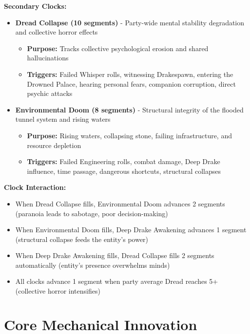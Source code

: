\documentclass[11pt]{article}
\begin{document}
\textbf{Secondary Clocks:}
\begin{itemize}
\item \textbf{Dread Collapse (10 segments)} - Party-wide mental stability degradation and collective horror effects
  \begin{itemize}
  \item \textbf{Purpose:} Tracks collective psychological erosion and shared hallucinations
  \item \textbf{Triggers:} Failed Whisper rolls, witnessing Drakespawn, entering the Drowned Palace, hearing personal fears, companion corruption, direct psychic attacks
  \end{itemize}
\item \textbf{Environmental Doom (8 segments)} - Structural integrity of the flooded tunnel system and rising waters
  \begin{itemize}
  \item \textbf{Purpose:} Rising waters, collapsing stone, failing infrastructure, and resource depletion
  \item \textbf{Triggers:} Failed Engineering rolls, combat damage, Deep Drake influence, time passage, dangerous shortcuts, structural collapses
  \end{itemize}
\end{itemize}

\textbf{Clock Interaction:}
\begin{itemize}
\item When Dread Collapse fills, Environmental Doom advances 2 segments (paranoia leads to sabotage, poor decision-making)
\item When Environmental Doom fills, Deep Drake Awakening advances 1 segment (structural collapse feeds the entity's power)
\item When Deep Drake Awakening fills, Dread Collapse fills 2 segments automatically (entity's presence overwhelms minds)
\item All clocks advance 1 segment when party average Dread reaches 5+ (collective horror intensifies)
\end{itemize}

\section{Core Mechanical Innovation}
\end{document}

